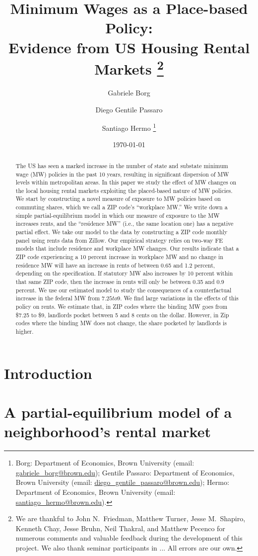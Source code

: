 \documentclass{article}
\title{ Minimum Wages as a Place-based Policy: \\
        Evidence from US Housing Rental Markets
        \thanks{We are thankful to John N.\ Friedman, Matthew Turner, Jesse M.\ Shapiro, 
        Kenneth Chay, Jesse Bruhn, Neil Thakral, and Matthew Pecenco for numerous 
        comments and valuable feedback during the development of this project.
        We also thank seminar participants in ... %
        All errors are our own.}}
\author{Gabriele Borg \and Diego Gentile Passaro \and Santiago Hermo
        \footnote{
        Borg: Department of Economics, Brown University 
        (email: \url{gabriele_borg@brown.edu}); 
        Gentile Passaro: Department of Economics, Brown University 
        (email: \url{diego_gentile_passaro@brown.edu}); 
        Hermo: Department of Economics, Brown University 
        (email: \url{santiago_hermo@brown.edu}).}}
\date{\today}
\begin{document}
\maketitle

\begin{abstract}
    \noindent
    The US has seen a marked increase in the number of state and substate minimum 
    wage (MW) policies in the past 10 years, resulting in significant dispersion 
    of MW levels within metropolitan areas.
    In this paper we study the effect of MW changes on the local housing rental 
    markets exploiting the placed-based nature of MW policies.
    We start by constructing a novel measure of exposure to MW policies based on 
    commuting shares, which we call a ZIP code's ``workplace MW.''
    We write down a simple partial-equilibrium model in which our measure of 
    exposure to the MW increases rents, and the ``residence MW'' (i.e., the same 
    location one) has a negative partial effect.
    We take our model to the data by constructing a ZIP code monthly panel using 
    rents data from Zillow.
    Our empirical strategy relies on two-way FE models that include residence and 
    workplace MW changes.
    Our results indicate that a ZIP code experiencing a 10 percent increase in 
    workplace MW and no change in residence MW will have an increase in rents of 
    between 0.65 and 1.2 percent, depending on the specification.
    If statutory MW also increases by 10 percent within that same ZIP code, then
    the increase in rents will only be between 0.35 and 0.9 percent.
    We use our estimated model to study the consequences of a counterfactual
    increase in the federal MW from $7.25 to $9.
    We find large variations in the effects of this policy on rents. 
    We estimate that, in ZIP codes where the binding MW goes from \$7.25 to \$9,
    landlords pocket between 5 and 8 cents on the dollar.
    However, in Zip codes where the binding MW does not change, the share pocketed
    by landlords is higher. 
\end{abstract}

\vspace{5mm}


\clearpage

\section{Introduction}\label{sec:intro}
    

\section{A partial-equilibrium model of a neighborhood's rental market}\label{sec:model}
	
\end{document}
